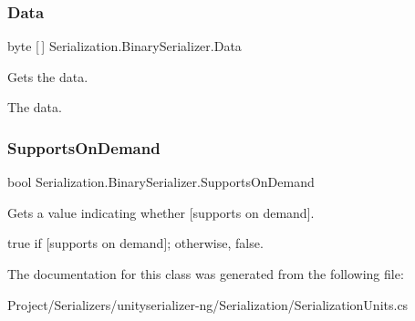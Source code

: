 \subsubsection{\texorpdfstring{Data}{Data}}
{\footnotesize\ttfamily byte \mbox{[}$\,$\mbox{]} Serialization.\+Binary\+Serializer.\+Data\hspace{0.3cm}{\ttfamily [get]}}



Gets the data. 

The data.\mbox{\label{class_serialization_1_1_binary_serializer_adfc81495319b13b39a24b79993e51213}} 
\subsubsection{\texorpdfstring{Supports\+On\+Demand}{SupportsOnDemand}}
{\footnotesize\ttfamily bool Serialization.\+Binary\+Serializer.\+Supports\+On\+Demand\hspace{0.3cm}{\ttfamily [get]}}



Gets a value indicating whether \mbox{[}supports on demand\mbox{]}. 

{\ttfamily true} if \mbox{[}supports on demand\mbox{]}; otherwise, {\ttfamily false}.

The documentation for this class was generated from the following file\+:\begin{DoxyCompactItemize}
\item 
Project/\+Serializers/unityserializer-\/ng/\+Serialization/Serialization\+Units.\+cs\end{DoxyCompactItemize}

